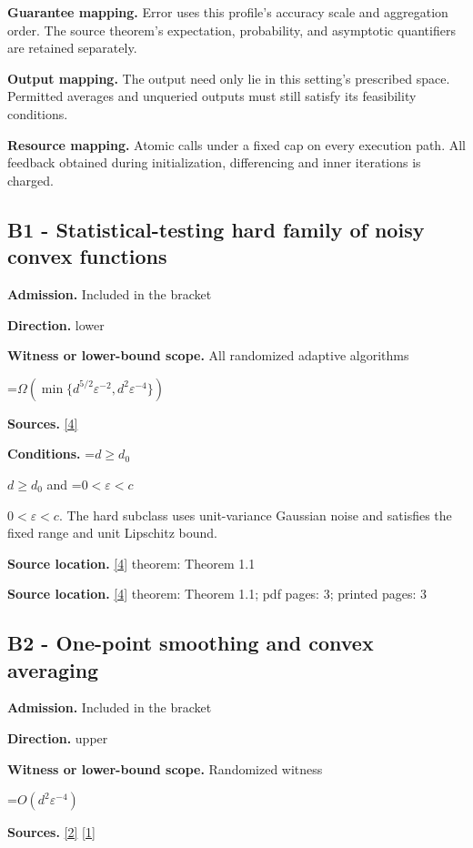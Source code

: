 \documentclass[10pt,a4paper]{article}
\newcommand{\AtlasMath}[1]{\par\begingroup\centering\setbox0=\hbox{$\displaystyle #1$}\ifdim\wd0>1.4\linewidth\typeout{ATLAS WIDE FORMULA: \the\wd0}\fi\ifdim\wd0>\linewidth\resizebox{\linewidth}{!}{\box0}\else\box0\fi\par\endgroup}
\newcommand{\AtlasInlineMath}[1]{\begingroup\setbox0=\hbox{$#1$}\ifdim\wd0>.4\linewidth\endgroup\AtlasMath{#1}\else\endgroup$#1$\fi}
\begin{document}
\textbf{Guarantee mapping.} Error uses this profile's accuracy scale and aggregation order. The source theorem's expectation, probability, and asymptotic quantifiers are retained separately.

\textbf{Output mapping.} The output need only lie in this setting's prescribed space. Permitted averages and unqueried outputs must still satisfy its feasibility conditions.

\textbf{Resource mapping.} Atomic calls under a fixed cap on every execution path. All feedback obtained during initialization, differencing and inner iterations is charged.

\subsection{B1 - Statistical-testing hard family of noisy convex functions}
\textbf{Admission.} Included in the bracket

\textbf{Direction.} lower

\textbf{Witness or lower-bound scope.} All randomized adaptive algorithms

\AtlasMath{\Omega\!\left(\min\{d^{5/2}\varepsilon^{-2},d^2\varepsilon^{-4}\}\right)}
\textbf{Sources.} \href{https://arxiv.org/html/2607.18652v3}{[4]}

\textbf{Conditions.} \AtlasInlineMath{d\ge d_0} and \AtlasInlineMath{0<\varepsilon<c}. The hard subclass uses unit-variance Gaussian noise and satisfies the fixed range and unit Lipschitz bound.

\textbf{Source location.} \href{https://arxiv.org/html/2607.18652v3}{[4]} theorem: Theorem 1.1

\textbf{Source location.} \href{https://arxiv.org/html/2607.18652v3}{[4]} theorem: Theorem 1.1; pdf pages: 3; printed pages: 3

\subsection{B2 - One-point smoothing and convex averaging}
\textbf{Admission.} Included in the bracket

\textbf{Direction.} upper

\textbf{Witness or lower-bound scope.} Randomized witness

\AtlasMath{O(d^2\varepsilon^{-4})}
\textbf{Sources.} \href{https://arxiv.org/abs/cs/0408007}{[2]} \href{https://arxiv.org/pdf/2406.06506}{[1]}
\end{document}
